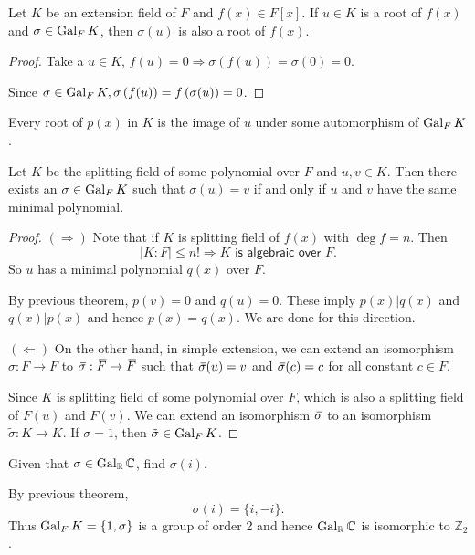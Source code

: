 \begin{theorem}
    Let $K$ be an extension field of $F$ and $f(x) \in F[x]$. If $u \in K$ is a root of $f(x)$ and $\sigma \in \operatorname{Gal}_F K$, 
    then $\sigma(u)$ is also a root of $f(x)$.
\end{theorem}
\begin{proof}
    Take a $u \in K$, $f(u) = 0 \Longrightarrow \sigma(f(u)) = \sigma(0) = 0$. 

    Since $\sigma \in \operatorname{Gal}_F K, \sigma \left( f(u) \right) = f\left( \sigma(u) \right) = 0$.
\end{proof}

\begin{remark}
    Every root of $p(x)$ in $K$ is the image of $u$ under some automorphism of $\operatorname{Gal}_F K$.
\end{remark}

\begin{theorem}
    Let $K$ be the splitting field of some polynomial over $F$ and $u,v \in K$. Then there exists an $\sigma \in \operatorname{Gal}_F K$ 
    such that $\sigma(u) = v$ if and only if $u$ and $v$ have the same minimal polynomial. 
\end{theorem}
\begin{proof}
    $(\Rightarrow)$ Note that if $K$ is splitting field of $f(x)$ with $\deg f = n$. Then 
    \[
        |K:F| \leq n! \Longrightarrow K \textsf{ is algebraic over } F.
    \]
    So $u$ has a minimal polynomial $q(x)$ over $F$.

    By previous theorem, $p(v) = 0$ and $q(u) = 0$. These imply $p(x) | q(x)$ and 
    $q(x) | p(x)$ and hence $p(x) = q(x)$. We are done for this direction.

    $(\Leftarrow)$ On the other hand, in simple extension, we can extend an isomorphism 
    $\sigma: F \to F$ to $\,\overline{\!{\sigma}}: \,\overline{\!{F}} \to \,\overline{\!{F}}$ such that 
    $\,\overline{\!{\sigma}}(u) = v$ and $\,\overline{\!{\sigma}}(c) = c$ for all constant $c \in F$. 

    Since $K$ is splitting field of some polynomial over $F$, which is also a splitting field of 
    $F(u)$ and $F(v)$. We can extend an isomorphism $\,\overline{\!{\sigma}}$ to an isomorphism 
    $\tilde{\sigma}: K \to K$. If $\sigma = 1$, then $\tilde{\sigma} \in \operatorname{Gal}_F K$.
\end{proof}

\begin{example}
    Given that $\sigma \in \operatorname{Gal}_\mathbb{R} \mathbb{C}$, find $\sigma(i)$.
\end{example}
\begin{solution}
    By previous theorem,
    \[
        \sigma(i) = \{ i, - i \}.
    \]
    Thus $\operatorname{Gal}_F K = \{1, \sigma \}$ is a group of order 2 and hence $\operatorname{Gal}_\mathbb{R} \mathbb{C}$ 
    is isomorphic to $\mathbb{Z}_2$.
\end{solution}

